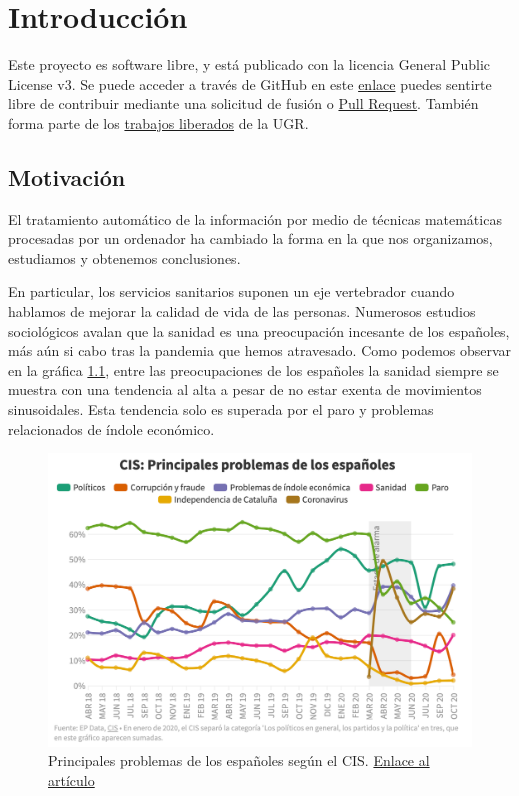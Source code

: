 \chapter{Introducción}
Este proyecto es software libre, y está publicado con la licencia \cite{gplv3} General
Public License v3. Se puede acceder a través de GitHub en este
\href{https://github.com/pablojjimenez/TFG}{enlace} puedes sentirte libre de contribuir
mediante una solicitud de fusión o \href{https://github.com/pablojjimenez/TFG/pulls}{Pull
Request}. También forma parte de los \href{https://github.com/JJ/TF-libres-UGR}{trabajos
liberados} de la UGR.

\section{Motivación} 
El tratamiento automático de la información por medio de técnicas matemáticas procesadas
por un ordenador ha cambiado la forma en la que nos organizamos, estudiamos y obtenemos
conclusiones.

En particular, los servicios sanitarios suponen un eje vertebrador cuando hablamos de
mejorar la calidad de vida de las personas. Numerosos estudios sociológicos avalan que la
sanidad es una preocupación incesante de los españoles, más aún si cabo tras la pandemia
que hemos atravesado. Como podemos observar en la gráfica \ref{fig:problemascis}, entre
las preocupaciones de los españoles la sanidad siempre se muestra con una tendencia al
alta a pesar de no estar exenta de movimientos sinusoidales. Esta tendencia solo es
superada por el paro y problemas relacionados de índole económico.

\FloatBarrier
\begin{figure}[h]
	\centering	
	\includegraphics[width=\textwidth]{doc/logos/imgs/CIS_1.png}
	\caption{ Principales problemas de los españoles según el CIS.
        \href{https://www.rtve.es/noticias/20201015/crisis-economica-coronavirus-preocupan-ahora-mas-espanoles-paro/2045610.shtml}{Enlace
        al artículo} }
    \label{fig:problemascis}
\end{figure}
\FloatBarrier

